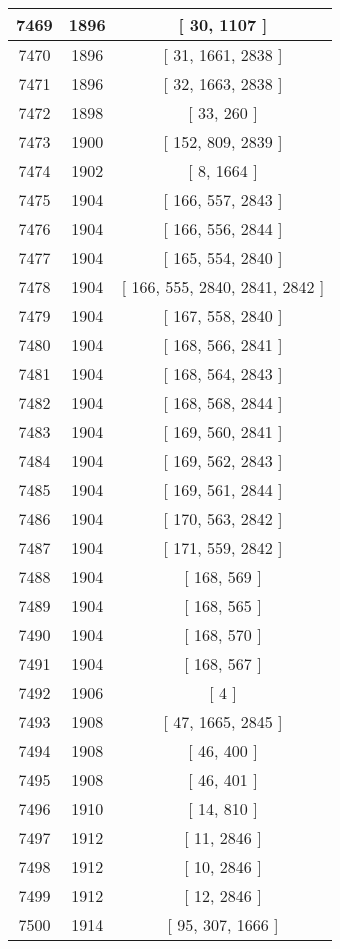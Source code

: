 \begin{center}
\begin{longtable}[H]{|| c c c ||}
\hline
7469 & 1896 & [ 30, 1107 ] \\ 
\hline
7470 & 1896 & [ 31, 1661, 2838 ] \\ 
\hline
7471 & 1896 & [ 32, 1663, 2838 ] \\ 
\hline
7472 & 1898 & [ 33, 260 ] \\ 
\hline
7473 & 1900 & [ 152, 809, 2839 ] \\ 
\hline
7474 & 1902 & [ 8, 1664 ] \\ 
\hline
7475 & 1904 & [ 166, 557, 2843 ] \\ 
\hline
7476 & 1904 & [ 166, 556, 2844 ] \\ 
\hline
7477 & 1904 & [ 165, 554, 2840 ] \\ 
\hline
7478 & 1904 & [ 166, 555, 2840, 2841, 2842 ] \\ 
\hline
7479 & 1904 & [ 167, 558, 2840 ] \\ 
\hline
7480 & 1904 & [ 168, 566, 2841 ] \\ 
\hline
7481 & 1904 & [ 168, 564, 2843 ] \\ 
\hline
7482 & 1904 & [ 168, 568, 2844 ] \\ 
\hline
7483 & 1904 & [ 169, 560, 2841 ] \\ 
\hline
7484 & 1904 & [ 169, 562, 2843 ] \\ 
\hline
7485 & 1904 & [ 169, 561, 2844 ] \\ 
\hline
7486 & 1904 & [ 170, 563, 2842 ] \\ 
\hline
7487 & 1904 & [ 171, 559, 2842 ] \\ 
\hline
7488 & 1904 & [ 168, 569 ] \\ 
\hline
7489 & 1904 & [ 168, 565 ] \\ 
\hline
7490 & 1904 & [ 168, 570 ] \\ 
\hline
7491 & 1904 & [ 168, 567 ] \\ 
\hline
7492 & 1906 & [ 4 ] \\ 
\hline
7493 & 1908 & [ 47, 1665, 2845 ] \\ 
\hline
7494 & 1908 & [ 46, 400 ] \\ 
\hline
7495 & 1908 & [ 46, 401 ] \\ 
\hline
7496 & 1910 & [ 14, 810 ] \\ 
\hline
7497 & 1912 & [ 11, 2846 ] \\ 
\hline
7498 & 1912 & [ 10, 2846 ] \\ 
\hline
7499 & 1912 & [ 12, 2846 ] \\ 
\hline
7500 & 1914 & [ 95, 307, 1666 ] \\ 

\end{longtable}
\end{center}
